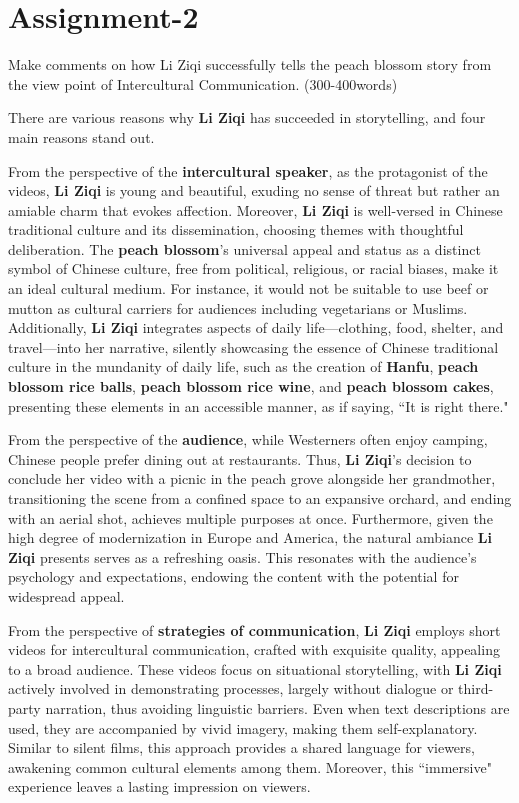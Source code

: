 \section{Assignment-2}

\begin{question}{}{}
    Make comments on how Li Ziqi successfully tells the peach blossom story from the view point of Intercultural Communication. (300-400words)
\end{question}

There are various reasons why \textbf{Li Ziqi} has succeeded in storytelling, and four main reasons stand out.

From the perspective of the \textbf{intercultural speaker}, as the protagonist of the videos, \textbf{Li Ziqi} is young and beautiful, exuding no sense of threat but rather an amiable charm that evokes affection. Moreover, \textbf{Li Ziqi} is well-versed in Chinese traditional culture and its dissemination, choosing themes with thoughtful deliberation. The \textbf{peach blossom}'s universal appeal and status as a distinct symbol of Chinese culture, free from political, religious, or racial biases, make it an ideal cultural medium. For instance, it would not be suitable to use beef or mutton as cultural carriers for audiences including vegetarians or Muslims. Additionally, \textbf{Li Ziqi} integrates aspects of daily life—clothing, food, shelter, and travel—into her narrative, silently showcasing the essence of Chinese traditional culture in the mundanity of daily life, such as the creation of \textbf{Hanfu}, \textbf{peach blossom rice balls}, \textbf{peach blossom rice wine}, and \textbf{peach blossom cakes}, presenting these elements in an accessible manner, as if saying, ``It is right there."

From the perspective of the \textbf{audience}, while Westerners often enjoy camping, Chinese people prefer dining out at restaurants. Thus, \textbf{Li Ziqi}'s decision to conclude her video with a picnic in the peach grove alongside her grandmother, transitioning the scene from a confined space to an expansive orchard, and ending with an aerial shot, achieves multiple purposes at once. Furthermore, given the high degree of modernization in Europe and America, the natural ambiance \textbf{Li Ziqi} presents serves as a refreshing oasis. This resonates with the audience’s psychology and expectations, endowing the content with the potential for widespread appeal.

From the perspective of \textbf{strategies of communication}, \textbf{Li Ziqi} employs short videos for intercultural communication, crafted with exquisite quality, appealing to a broad audience. These videos focus on situational storytelling, with \textbf{Li Ziqi} actively involved in demonstrating processes, largely without dialogue or third-party narration, thus avoiding linguistic barriers. Even when text descriptions are used, they are accompanied by vivid imagery, making them self-explanatory. Similar to silent films, this approach provides a shared language for viewers, awakening common cultural elements among them. Moreover, this ``immersive" experience leaves a lasting impression on viewers.

